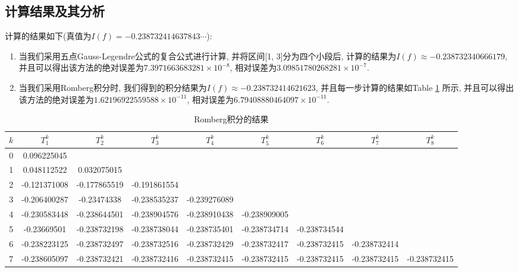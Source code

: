 \documentclass[a4paper]{article}
\begin{document}
\begin{spacing}{1.5}
\begin{CJK*}{GBK}{song}
\section{计算结果及其分析}
计算的结果如下(真值为$I(f) = -0.238732414637843\cdots$):
\begin{enumerate}[(1)]
\item 当我们采用五点Gauss-Legendre公式的复合公式进行计算, 并将区间[1, 3]分为四个小段后, 计算的结果为$I(f)\approx -0.238732340666179$, 并且可以得出该方法的绝对误差为$7.3971663683281\times 10^{-8}$, 相对误差为$3.09851780268281\times 10^{-7}$.
\item 当我们采用Romberg积分时, 我们得到的积分结果为$I(f)\approx -0.238732414621623 $, 并且每一步计算的结果如Table \ref{romberg_res} 所示, 并且可以得出该方法的绝对误差为$1.62196922559588\times 10^{-11}$, 相对误差为$6.79408880464097\times 10^{-11}$.
\end{enumerate}
\begin{table}[!htpb]
\begin{tiny}
\begin{center}
\begin{spacing}{1}
\caption{Romberg积分的结果}\label{romberg_res}
\begin{tabular}{ccccccccc}
\toprule
$k$ & $T_1^k$ & $T_2^k$  & $T_3^k$  & $T_4^k$  & $T_5^k$  & $T_6^k$  & $T_7^k$  & $T_8^k$  \\
\midrule
0	&	0.096225045	&		&		&		&		&		&		&		\\
1	&	0.048112522	&	0.032075015	&		&		&		&		&		&		\\
2	&	-0.121371008	&	-0.177865519	&	-0.191861554	&		&		&		&		&		\\
3	&	-0.206400287	&	-0.23474338	&	-0.238535237	&	-0.239276089	&		&		&		&		\\
4	&	-0.230583448	&	-0.238644501	&	-0.238904576	&	-0.238910438	&	-0.238909005	&		&		&		\\
5	&	-0.23669501	&	-0.238732198	&	-0.238738044	&	-0.238735401	&	-0.238734714	&	-0.238734544	&		&		\\
6	&	-0.238223125	&	-0.238732497	&	-0.238732516	&	-0.238732429	&	-0.238732417	&	-0.238732415	&	-0.238732414	&		\\
7	&	-0.238605097	&	-0.238732421	&	-0.238732416	&	-0.238732415	&	-0.238732415	&	-0.238732415	&	-0.238732415	&	-0.238732415	\\



\end{tabular}
\end{spacing}
\end{center}
\end{tiny}
\end{table}
\end{CJK*}
\end{spacing}
\end{document}
